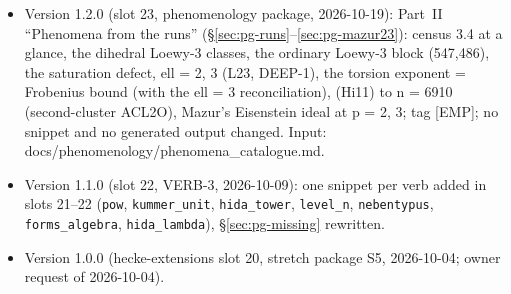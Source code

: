 \documentclass[11pt]{article}
\newcommand{\code}[1]{\texttt{#1}}
\begin{document}
\begin{itemize}[leftmargin=1.6em,itemsep=2pt]
\item Version 1.2.0 (slot 23, phenomenology package, 2026-10-19): Part~II ``Phenomena from the runs'' (\S\ref{sec:pg-runs}--\ref{sec:pg-mazur23}): census 3.4 at a glance, the dihedral Loewy-3 classes, the ordinary Loewy-3 block (547,486), the saturation defect, ell = 2, 3 (L23, DEEP-1), the torsion exponent = Frobenius bound (with the ell = 3 reconciliation), (Hi11) to n = 6910 (second-cluster ACL2O), Mazur's Eisenstein ideal at p = 2, 3; tag [EMP]; no snippet and no generated output changed. Input: docs/phenomenology/phenomena\_catalogue.md.
\item Version 1.1.0 (slot 22, VERB-3, 2026-10-09): one snippet per verb added in slots 21--22 (\code{pow}, \code{kummer\_unit}, \code{hida\_tower}, \code{level\_n}, \code{nebentypus}, \code{forms\_algebra}, \code{hida\_lambda}), \S\ref{sec:pg-missing} rewritten.
\item Version 1.0.0 (hecke-extensions slot 20, stretch package S5, 2026-10-04; owner request of 2026-10-04).
\end{itemize}



\end{document}
